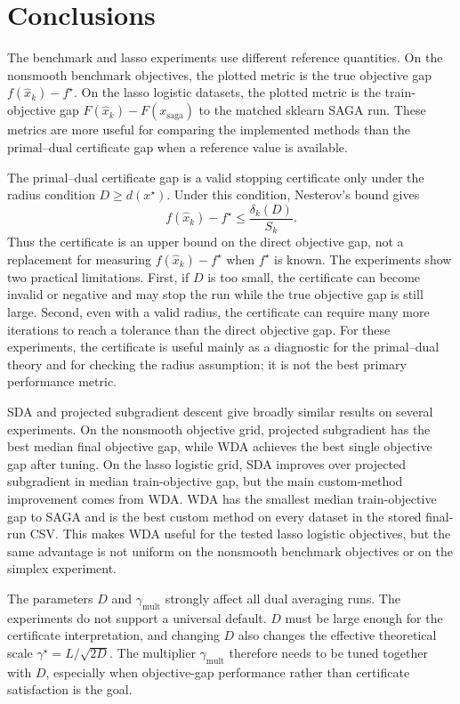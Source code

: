 \documentclass[11pt]{article}
\begin{document}
\FloatBarrier

\section{Conclusions}
\label{sec:conclusions}

The benchmark and lasso experiments use different reference quantities.  On the
nonsmooth benchmark objectives, the plotted metric is the true objective gap
\(f(\hat x_k)-f^\star\).  On the lasso logistic datasets, the plotted metric is
the train-objective gap \(F(\hat x_k)-F(x_{\mathrm{saga}})\) to the matched
sklearn SAGA run.  These metrics are more useful for comparing the implemented
methods than the primal--dual certificate gap when a reference value is
available.

The primal--dual certificate gap is a valid stopping certificate only under the
radius condition \(D\ge d(x^\star)\).  Under this condition, Nesterov's bound
gives
\[
    f(\hat x_k)-f^\star \le \frac{\delta_k(D)}{S_k}.
\]
Thus the certificate is an upper bound on the direct objective gap, not a
replacement for measuring \(f(\hat x_k)-f^\star\) when \(f^\star\) is known.
The experiments show two practical limitations.  First, if \(D\) is too small,
the certificate can become invalid or negative and may stop the run while the
true objective gap is still large.  Second, even with a valid radius, the
certificate can require many more iterations to reach a tolerance than the
direct objective gap.  For these experiments, the certificate is useful mainly
as a diagnostic for the primal--dual theory and for checking the radius
assumption; it is not the best primary performance metric.

SDA and projected subgradient descent give broadly similar results on several
experiments.  On the nonsmooth objective grid, projected subgradient has the
best median final objective gap, while WDA achieves the best single objective
gap after tuning.  On the lasso logistic grid, SDA improves over projected
subgradient in median train-objective gap, but the main custom-method
improvement comes from WDA.  WDA has the smallest median train-objective gap to
SAGA and is the best custom method on every dataset in the stored final-run
CSV.  This makes WDA useful for the tested lasso logistic objectives, but the
same advantage is not uniform on the nonsmooth benchmark objectives or on the
simplex experiment.

The parameters \(D\) and \(\gamma_{\mathrm{mult}}\) strongly affect all dual
averaging runs.  The experiments do not support a universal default.  \(D\)
must be large enough for the certificate interpretation, and changing \(D\)
also changes the effective theoretical scale
\(\gamma^\star=L/\sqrt{2D}\).  The multiplier \(\gamma_{\mathrm{mult}}\)
therefore needs to be tuned together with \(D\), especially when objective-gap
performance rather than certificate satisfaction is the goal.
\end{document}
